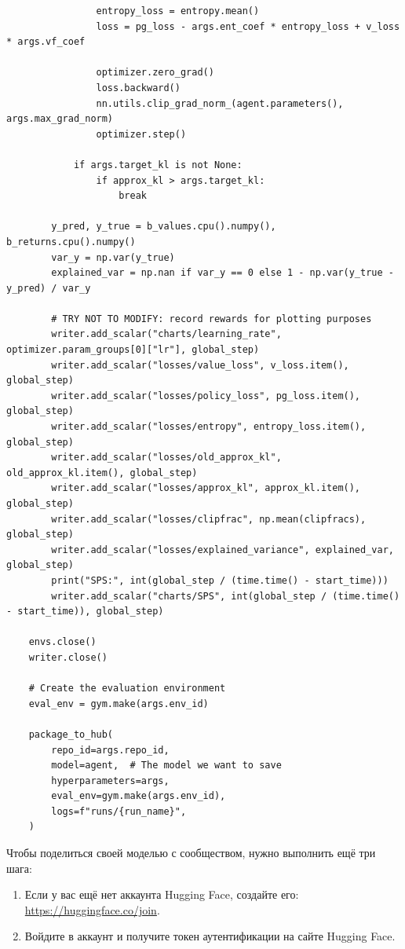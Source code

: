 \documentclass[11pt,a4paper]{article}
\begin{document}
\begin{lstlisting}
                entropy_loss = entropy.mean()
                loss = pg_loss - args.ent_coef * entropy_loss + v_loss * args.vf_coef

                optimizer.zero_grad()
                loss.backward()
                nn.utils.clip_grad_norm_(agent.parameters(), args.max_grad_norm)
                optimizer.step()

            if args.target_kl is not None:
                if approx_kl > args.target_kl:
                    break

        y_pred, y_true = b_values.cpu().numpy(), b_returns.cpu().numpy()
        var_y = np.var(y_true)
        explained_var = np.nan if var_y == 0 else 1 - np.var(y_true - y_pred) / var_y

        # TRY NOT TO MODIFY: record rewards for plotting purposes
        writer.add_scalar("charts/learning_rate", optimizer.param_groups[0]["lr"], global_step)
        writer.add_scalar("losses/value_loss", v_loss.item(), global_step)
        writer.add_scalar("losses/policy_loss", pg_loss.item(), global_step)
        writer.add_scalar("losses/entropy", entropy_loss.item(), global_step)
        writer.add_scalar("losses/old_approx_kl", old_approx_kl.item(), global_step)
        writer.add_scalar("losses/approx_kl", approx_kl.item(), global_step)
        writer.add_scalar("losses/clipfrac", np.mean(clipfracs), global_step)
        writer.add_scalar("losses/explained_variance", explained_var, global_step)
        print("SPS:", int(global_step / (time.time() - start_time)))
        writer.add_scalar("charts/SPS", int(global_step / (time.time() - start_time)), global_step)

    envs.close()
    writer.close()

    # Create the evaluation environment
    eval_env = gym.make(args.env_id)

    package_to_hub(
        repo_id=args.repo_id,
        model=agent,  # The model we want to save
        hyperparameters=args,
        eval_env=gym.make(args.env_id),
        logs=f"runs/{run_name}",
    )
\end{lstlisting}

Чтобы поделиться своей моделью с сообществом, нужно выполнить ещё три шага:

\begin{enumerate}
\def\labelenumi{\arabic{enumi}.}
\item
  Если у вас ещё нет аккаунта Hugging Face, создайте его: \url{https://huggingface.co/join}.
\item
  Войдите в аккаунт и получите токен аутентификации на сайте Hugging Face.
\end{enumerate}
\end{document}
